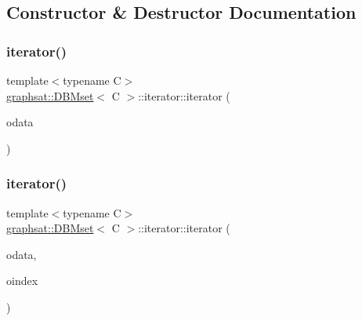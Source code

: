 \subsection{Constructor \& Destructor Documentation}
\mbox{\label{classgraphsat_1_1_d_b_mset_1_1iterator_a39375a6f409e03726c70680ecade1c96}} 
\subsubsection{\texorpdfstring{iterator()}{iterator()}\hspace{0.1cm}{\footnotesize\ttfamily [1/3]}}
{\footnotesize\ttfamily template$<$typename C$>$ \\
\mbox{\hyperlink{classgraphsat_1_1_d_b_mset}{graphsat\+::\+D\+B\+Mset}}$<$ C $>$\+::iterator\+::iterator (\begin{DoxyParamCaption}\item[{\mbox{\hyperlink{classgraphsat_1_1_d_b_mset}{D\+B\+Mset}}$<$ C $>$ $\ast$}]{odata }\end{DoxyParamCaption})\hspace{0.3cm}{\ttfamily [inline]}}

\mbox{\label{classgraphsat_1_1_d_b_mset_1_1iterator_a839132c4007560a7eedebd57960aa7df}} 
\subsubsection{\texorpdfstring{iterator()}{iterator()}\hspace{0.1cm}{\footnotesize\ttfamily [2/3]}}
{\footnotesize\ttfamily template$<$typename C$>$ \\
\mbox{\hyperlink{classgraphsat_1_1_d_b_mset}{graphsat\+::\+D\+B\+Mset}}$<$ C $>$\+::iterator\+::iterator (\begin{DoxyParamCaption}\item[{\mbox{\hyperlink{classgraphsat_1_1_d_b_mset}{D\+B\+Mset}}$<$ C $>$ $\ast$}]{odata,  }\item[{size\+\_\+t}]{oindex }\end{DoxyParamCaption})\hspace{0.3cm}{\ttfamily [inline]}}

